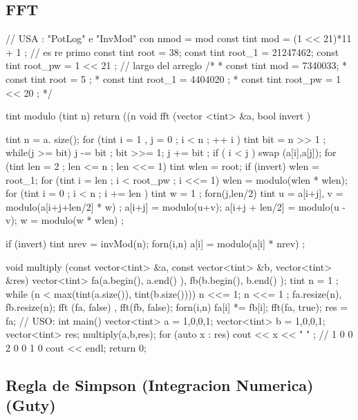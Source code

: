 \subsection{FFT}
\begin{code}
// USA : "PotLog" e "InvMod" con nmod = mod 
const tint mod = (1 << 21)*11 + 1 ; // es re primo
const tint root = 38;
const tint root_1 = 21247462;
const tint root_pw = 1 << 21 ; // largo del arreglo
/*
 * const tint mod = 7340033;
 * const tint root = 5 ;
 * const tint root_1 = 4404020 ;
 * const tint root_pw = 1 << 20 ; 
 */
 
tint modulo (tint n)
{
	return ((n %
}
void fft (vector <tint> &a, bool invert )
{
	tint n = a. size();
	for (tint i = 1 , j = 0 ; i < n ; ++ i )
	{
		tint bit = n >> 1 ;
		while(j >= bit)
		{
			j -= bit ;
			bit >>= 1;
		}
		j += bit ;
		if ( i < j )
			swap (a[i],a[j]);
	}
	for (tint len = 2 ; len <= n ; len <<= 1) 
	{
		tint wlen = root;
		if (invert)
			wlen = root_1;
		for (tint i = len ; i < root_pw ; i <<= 1)
			wlen = modulo(wlen * wlen);
		for (tint i = 0 ; i < n ; i += len ) 
		{
			tint w = 1 ;
			forn(j,len/2)
			{
				tint u = a[i+j], v = modulo(a[i+j+len/2] * w) ;
				a[i+j] = modulo(u+v);
				a[i+j + len/2] = modulo(u - v);
				w = modulo(w * wlen) ;
			}
		}
	}
	
	if (invert) 
	{
		tint nrev = invMod(n);
		forn(i,n)
			a[i] = modulo(a[i] * nrev) ;
	}
}

void multiply (const vector<tint> &a, const vector<tint> &b, vector<tint> &res) 
{
	vector<tint> fa(a.begin(), a.end() ), fb(b.begin(), b.end() );
	tint n = 1 ;
	while (n < max(tint(a.size()), tint(b.size())))
		n <<= 1;
	n <<= 1 ;
	fa.resize(n), fb.resize(n);
	fft (fa, false) , fft(fb, false);
	forn(i,n)
		fa[i] *= fb[i];
	fft(fa, true);
	res = fa;
} 
// USO:
int main()
{
	vector<tint> a = {1,0,0,1};
	vector<tint> b = {1,0,0,1};
	vector<tint> res;
	multiply(a,b,res);
	for (auto x : res)
		cout << x << " " ; // 1 0 0 2 0 0 1 0 
	cout << endl;
	return 0;
}

\end{code}

\subsection{Regla de Simpson (Integracion Numerica) (Guty)}
\begin{code}
\end{code}
